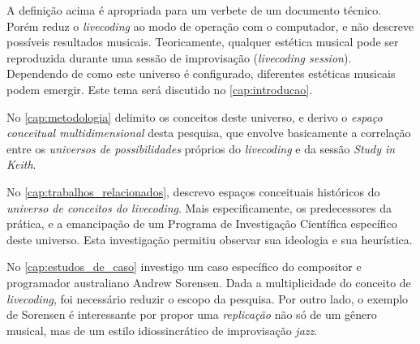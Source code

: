 A definição acima é apropriada para um verbete de um documento técnico. Porém reduz o \emph{livecoding} ao modo de operação com o computador, e não descreve possíveis resultados musicais. Teoricamente, qualquer estética musical pode ser reproduzida durante uma sessão de improvisação (\emph{livecoding session}). Dependendo de como este universo é configurado, diferentes estéticas musicais podem emergir. Este tema será discutido no \autoref{cap:introducao}. 


No \autoref{cap:metodologia} delimito os conceitos deste universo, e derivo o \emph{espaço conceitual multidimensional} desta pesquisa, que envolve basicamente a correlação entre os \emph{universos de possibilidades} próprios do \emph{livecoding} e da sessão \emph{Study in Keith}.

No \autoref{cap:trabalhos_relacionados}, descrevo espaços conceituais históricos do \emph{universo de conceitos do livecoding}. Mais especificamente, os predecessores da prática, e a emancipação de um Programa de Investigação Científica específico deste universo. Esta investigação permitiu observar sua ideologia e sua heurística.

No \autoref{cap:estudos_de_caso} investigo um caso específico do compositor e programador australiano Andrew Sorensen. Dada a multiplicidade do conceito de \emph{livecoding}, foi necessário reduzir o escopo da pesquisa. Por outro lado, o exemplo de Sorensen é interessante por propor uma \emph{replicação} não só de um gênero musical, mas de um estilo idiossincrático de improvisação \emph{jazz}.